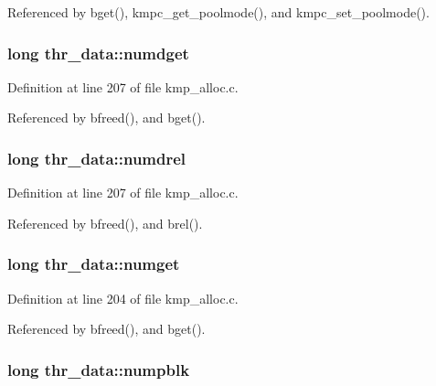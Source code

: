 Referenced by bget(), kmpc\-\_\-get\-\_\-poolmode(), and kmpc\-\_\-set\-\_\-poolmode().

\hypertarget{structthr__data_a2306c5452a73e20dd817a16363162f62}{
\subsubsection[{numdget}]{\setlength{\rightskip}{0pt plus 5cm}long thr\-\_\-data\-::numdget}}\label{structthr__data_a2306c5452a73e20dd817a16363162f62}


Definition at line 207 of file kmp\-\_\-alloc.\-c.



Referenced by bfreed(), and bget().

\hypertarget{structthr__data_a8f43a52aba5a9b92da0da539dba756c1}{
\subsubsection[{numdrel}]{\setlength{\rightskip}{0pt plus 5cm}long thr\-\_\-data\-::numdrel}}\label{structthr__data_a8f43a52aba5a9b92da0da539dba756c1}


Definition at line 207 of file kmp\-\_\-alloc.\-c.



Referenced by bfreed(), and brel().

\hypertarget{structthr__data_afefb9a334169efb3a1b64eee22f3e60c}{
\subsubsection[{numget}]{\setlength{\rightskip}{0pt plus 5cm}long thr\-\_\-data\-::numget}}\label{structthr__data_afefb9a334169efb3a1b64eee22f3e60c}


Definition at line 204 of file kmp\-\_\-alloc.\-c.



Referenced by bfreed(), and bget().

\hypertarget{structthr__data_ace2317a7c31b3b8ecb3b10ea1067fee0}{
\subsubsection[{numpblk}]{\setlength{\rightskip}{0pt plus 5cm}long thr\-\_\-data\-::numpblk}}\label{structthr__data_ace2317a7c31b3b8ecb3b10ea1067fee0}


